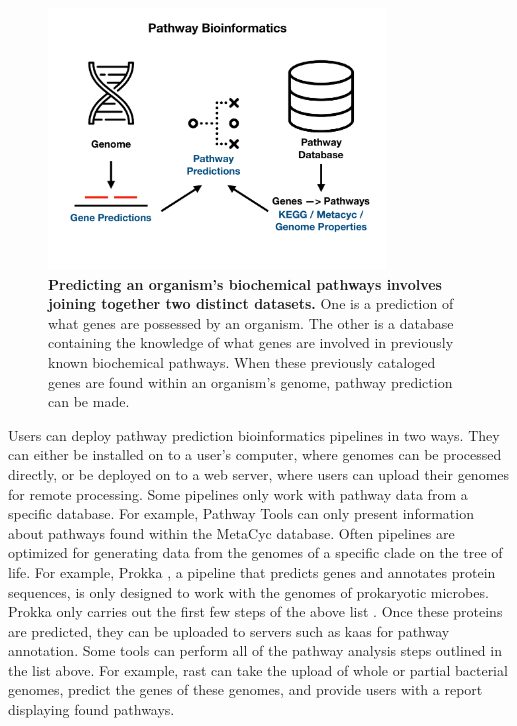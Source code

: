\begin{figure}[!ht]
  \centering
	\includegraphics[width=0.8\textwidth]{media/pathway_bioinformatics.pdf}
	 \caption[Predicting an organism's biochemical pathways involves joining 
together two distinct datasets.]{\textbf{Predicting an organism's biochemical 
pathways involves joining together two distinct datasets.} One is a prediction 
of what genes are possessed by an organism. The other is a database containing 
the knowledge of what genes are involved in previously known biochemical 
pathways. When these previously cataloged genes are found within an organism's 
genome, pathway prediction can be made.}
	 \label{fig:pathway-analysis-overview}
\end{figure}

Users can deploy pathway prediction bioinformatics pipelines in two ways. They 
can either be installed on to a user's computer, where genomes can be processed 
directly, or be deployed on to a web server, where users can upload their 
genomes for remote processing. Some pipelines only work with pathway data from a 
specific database. For example, Pathway Tools \cite{karp2002pathway} can only 
present information about pathways found within the MetaCyc 
\cite{karp2002metacyc} database. Often pipelines are optimized for generating 
data from the genomes of a specific clade on the tree of life. For example, 
Prokka \cite{seemann2014prokka}, a pipeline that predicts genes and annotates 
protein sequences, is only designed to work with the genomes of prokaryotic 
microbes. Prokka only carries out the first few steps of the above list 
\cite{seemann2014prokka}. Once these proteins are predicted, they can be 
uploaded to servers such as \gls{kaas} \cite{moriya2007kaas} for pathway 
annotation. Some tools can perform all of the pathway analysis steps outlined in 
the list above. For example, \gls{rast} \cite{aziz2008rast} can take the upload 
of whole or partial bacterial genomes, predict the genes of these genomes, and 
provide users with a report displaying found pathways.

